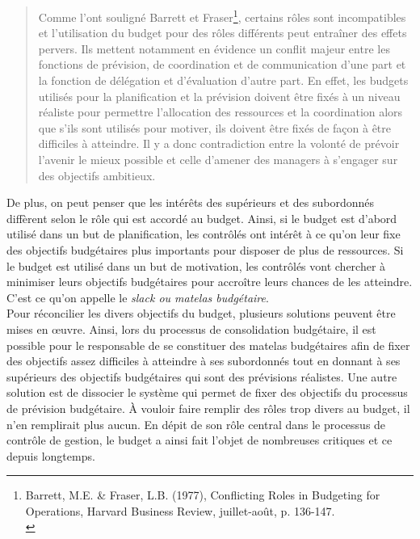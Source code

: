 \documentclass{kaobook}
\begin{document}
\begin{quote}
Comme l'ont souligné Barrett et Fraser\footnote{Barrett, M.E. \& Fraser, L.B. (1977), Conflicting Roles in Budgeting for Operations, Harvard Business Review, juillet-août, p. 136-147.\\}, certains rôles sont incompatibles et l'utilisation du budget pour des rôles différents peut entraîner des effets pervers. Ils mettent notamment en évidence un conflit majeur entre les fonctions de prévision, de coordination et de communication d'une part et la fonction de délégation et d'évaluation d'autre part. En effet, les budgets utilisés pour la planification et la prévision doivent être fixés à un niveau réaliste pour permettre l'allocation des ressources et la coordination alors que s'ils sont utilisés pour motiver, ils doivent être fixés de façon à être difficiles à atteindre. Il y a donc contradiction entre la volonté de prévoir l'avenir le mieux possible et celle d'amener des managers à s'engager sur des objectifs ambitieux.\\
\end{quote}

De plus, on peut penser que les intérêts des supérieurs et des subordonnés diffèrent selon le rôle qui est accordé au budget. Ainsi, si le budget est d'abord utilisé dans un but de planification, les contrôlés ont intérêt à ce qu'on leur fixe des objectifs budgétaires plus importants pour disposer de plus de ressources. Si le budget est utilisé dans un but de motivation, les contrôlés vont chercher à minimiser leurs objectifs budgétaires pour accroître leurs chances de les atteindre. C'est ce qu'on appelle le \emph{slack ou matelas budgétaire}.\\

Pour réconcilier les divers objectifs du budget, plusieurs solutions peuvent être mises en œuvre. Ainsi, lors du processus de consolidation budgétaire, il est possible pour le responsable de se constituer des matelas budgétaires afin de fixer des objectifs assez difficiles à atteindre à ses subordonnés tout en donnant à ses supérieurs des objectifs budgétaires qui sont des prévisions réalistes. Une autre solution est de dissocier le système qui permet de fixer des objectifs du processus de prévision budgétaire. À vouloir faire remplir des rôles trop divers au budget, il n'en remplirait plus aucun. En dépit de son rôle central dans le processus de contrôle de gestion, le budget a ainsi fait l'objet de nombreuses critiques et ce depuis longtemps.\\
\end{document}

